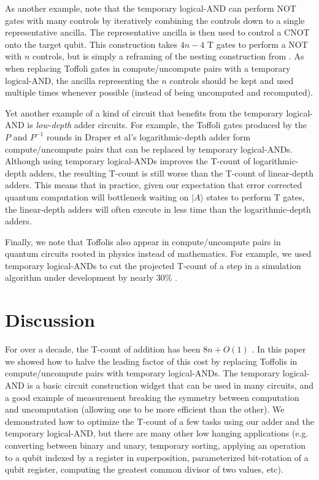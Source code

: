\documentclass[twocolumn]{revtex4-1}
\begin{document}
As another example, note that the temporary logical-AND can perform NOT gates with many controls by iteratively combining the controls down to a single representative ancilla.
The representative ancilla is then used to control a CNOT onto the target qubit.
This construction takes $4n-4$ T gates to perform a NOT with $n$ controls, but is simply a reframing of the nesting construction from \cite{Jones2013}.
As when replacing Toffoli gates in compute/uncompute pairs with a temporary logical-AND, the ancilla representing the $n$ controls should be kept and used multiple times whenever possible (instead of being uncomputed and recomputed).

Yet another example of a kind of circuit that benefits from the temporary logical-AND is {\em low-depth} adder circuits.
For example, the Toffoli gates produced by the $P$ and $P^{-1}$ rounds in Draper et al's logarithmic-depth adder \cite{Draper2004} form compute/uncompute pairs that can be replaced by temporary logical-ANDs.
Although using temporary logical-ANDs improves the T-count of logarithmic-depth adders, the resulting T-count is still worse than the T-count of linear-depth adders.
This means that in practice, given our expectation that error corrected quantum computation will bottleneck waiting on $|A\rangle$ states to perform T gates, the linear-depth adders will often execute in less time than the logarithmic-depth adders.

Finally, we note that Toffolis also appear in compute/uncompute pairs in quantum circuits rooted in physics instead of mathematics.
For example, we used temporary logical-ANDs to cut the projected T-count of a step in a simulation algorithm under development by nearly 30\% \citep{RyanEmails2017}.


\section*{Discussion}

For over a decade, the T-count of addition has been $8n + O(1)$ \citep{Amy2013, Barenco1995, Cuccaro2004}.
In this paper we showed how to halve the leading factor of this cost by replacing Toffolis in compute/uncompute pairs with temporary logical-ANDs.
The temporary logical-AND is a basic circuit construction widget that can be used in many circuits, and a good example of measurement breaking the symmetry between computation and uncomputation (allowing one to be more efficient than the other).
We demonstrated how to optimize the T-count of a few tasks using our adder and the temporary logical-AND, but there are many other low hanging applications (e.g. converting between binary and unary, temporary sorting, applying an operation to a qubit indexed by a register in superposition, parameterized bit-rotation of a qubit register, computing the greatest common divisor of two values, etc).
\end{document}
